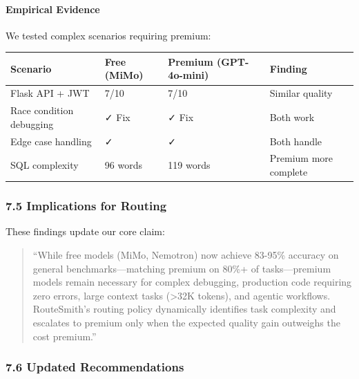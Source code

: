 \documentclass[
]{article}
\begin{document}
\hypertarget{empirical-evidence}{%
\paragraph{Empirical Evidence}\label{empirical-evidence}}

We tested complex scenarios requiring premium:

\begin{longtable}[]{@{}llll@{}}
\toprule
Scenario & Free (MiMo) & Premium (GPT-4o-mini) & Finding \\
\midrule
\endhead
Flask API + JWT & 7/10 & 7/10 & Similar quality \\
Race condition debugging & ✓ Fix & ✓ Fix & Both work \\
Edge case handling & ✓ & ✓ & Both handle \\
SQL complexity & 96 words & 119 words & Premium more complete \\
\bottomrule
\end{longtable}

\hypertarget{implications-for-routing}{%
\subsubsection{7.5 Implications for
Routing}\label{implications-for-routing}}

These findings update our core claim:

\begin{quote}
``While free models (MiMo, Nemotron) now achieve 83-95\% accuracy on
general benchmarks---matching premium on 80\%+ of tasks---premium models
remain necessary for complex debugging, production code requiring zero
errors, large context tasks (\textgreater32K tokens), and agentic
workflows. RouteSmith's routing policy dynamically identifies task
complexity and escalates to premium only when the expected quality gain
outweighs the cost premium.''
\end{quote}

\hypertarget{updated-recommendations}{%
\subsubsection{7.6 Updated
Recommendations}\label{updated-recommendations}}
\end{document}
